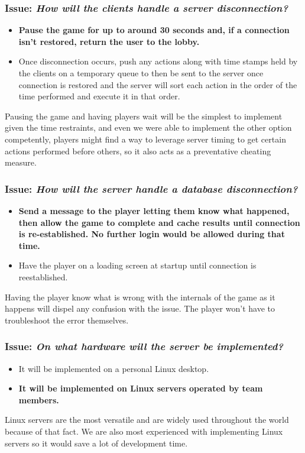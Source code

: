 \subsubsection*{Issue: \textit{How will the clients handle a server disconnection?}}

  \begin{itemize}
    \item \textbf{Pause the game for up to around 30 seconds and, if a connection isn't restored, return the user to the lobby.}
    \item Once disconnection occurs, push any actions along with time stamps held by the clients on a temporary queue to then be sent to the server once connection is restored and the server will sort each action in the order of the time performed and execute it in that order. 
  \end{itemize}

Pausing the game and having players wait will be the simplest to implement given the time restraints, and even we were able to implement the other option competently, players might find a way to leverage server timing to get certain actions performed before others, so it also acts as a preventative cheating measure.

\subsubsection*{Issue: \textit{How will the server handle a database disconnection?}}

  \begin{itemize}
    \item \textbf{Send a message to the player letting them know what happened, then allow the game to complete and cache results until connection is re-established. No further login would be allowed during that time.}
    \item Have the player on a loading screen at startup until connection is reestablished.
  \end{itemize}

Having the player know what is wrong with the internals of the game as it happens will dispel any confusion with the issue. The player won't have to troubleshoot the error themselves.

\subsubsection*{Issue: \textit{On what hardware will the server be implemented?}}

  \begin{itemize}
    \item It will be implemented on a personal Linux desktop.
    \item \textbf{It will be implemented on Linux servers operated by team members.}
  \end{itemize}

Linux servers are the most versatile and are widely used throughout the world because of that fact. We are also most experienced with implementing Linux servers so it would save a lot of development time.
